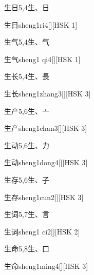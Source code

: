 \begin{entry}{生日}{5,4}{⽣、⽇}
  \begin{phonetics}{生日}{sheng1ri4}[][HSK 1]
  \end{phonetics}
\end{entry}

\begin{entry}{生气}{5,4}{⽣、⽓}
  \begin{phonetics}{生气}{sheng1 qi4}[][HSK 1]
  \end{phonetics}
\end{entry}

\begin{entry}{生长}{5,4}{⽣、⾧}
  \begin{phonetics}{生长}{sheng1zhang3}[][HSK 3]
  \end{phonetics}
\end{entry}

\begin{entry}{生产}{5,6}{⽣、⼇}
  \begin{phonetics}{生产}{sheng1chan3}[][HSK 3]
  \end{phonetics}
\end{entry}

\begin{entry}{生动}{5,6}{⽣、⼒}
  \begin{phonetics}{生动}{sheng1dong4}[][HSK 3]
  \end{phonetics}
\end{entry}

\begin{entry}{生存}{5,6}{⽣、⼦}
  \begin{phonetics}{生存}{sheng1cun2}[][HSK 3]
  \end{phonetics}
\end{entry}

\begin{entry}{生词}{5,7}{⽣、⾔}
  \begin{phonetics}{生词}{sheng1 ci2}[][HSK 2]
  \end{phonetics}
\end{entry}

\begin{entry}{生命}{5,8}{⽣、⼝}
  \begin{phonetics}{生命}{sheng1ming4}[][HSK 3]
  \end{phonetics}
\end{entry}


